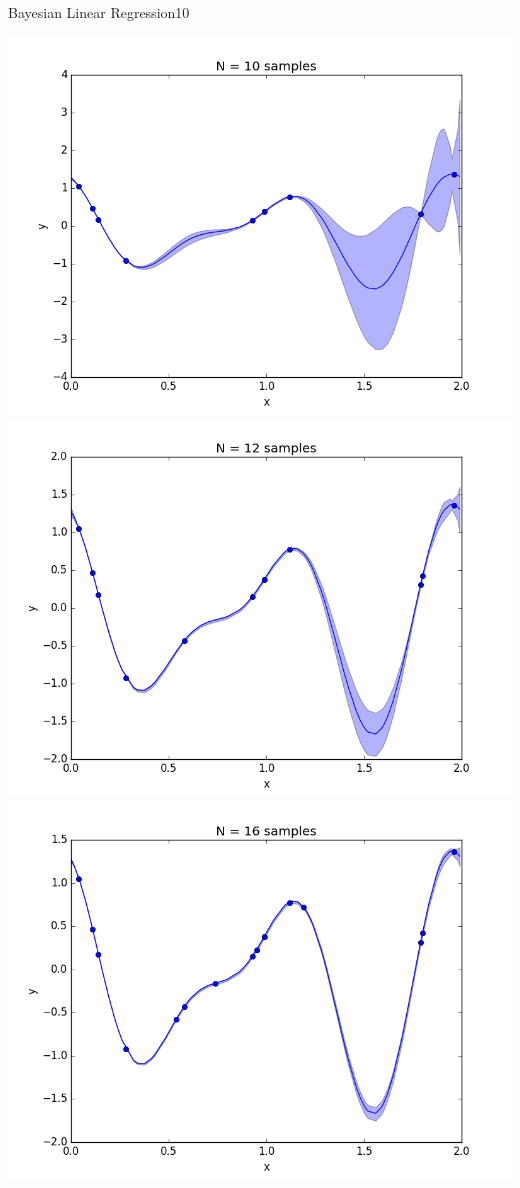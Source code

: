 \begin{questions}
\begin{question}{Bayesian Linear Regression}{10}
\begin{answer}
\centering \includegraphics[width=1.0\linewidth]{img/31d_10} \\
\centering \includegraphics[width=1.0\linewidth]{img/31d_12} \\
\centering \includegraphics[width=1.0\linewidth]{img/31d_16} \\

\end{answer}
\end{question}
\end{questions}
